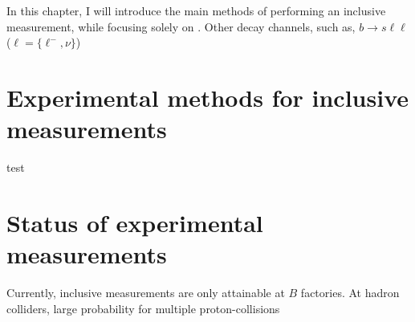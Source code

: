 In this chapter, I will introduce the main methods of performing an inclusive measurement, while focusing solely on \BtoXsgamma.
Other decay channels, such as, $b\to s\ell\ell$ ($\ell=\{\ell^-,\nu\}$)

\section{Experimental methods for inclusive measurements}
test

\section{Status of experimental measurements}
Currently, inclusive measurements are only attainable at $B$ factories.
At hadron colliders, large probability for multiple proton-collisions